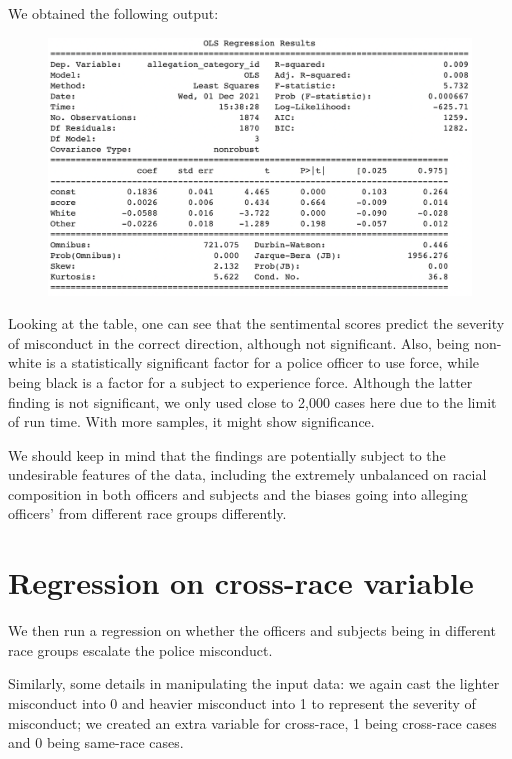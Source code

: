 \documentclass[10pt]{article}
\begin{document}
We obtained the following output:

\begin{figure}[H]
\centering
\includegraphics[width=\textwidth]{regression1}
\end{figure}


Looking at the table, one can see that the sentimental scores predict the severity of misconduct in the correct direction, although not significant. Also, being non-white is a statistically significant factor for a police officer to use force, while being black is a factor for a subject to experience force. Although the latter finding is not significant, we only used close to 2,000 cases here due to the limit of run time. With more samples, it might show significance. 

We should keep in mind that the findings are potentially subject to the undesirable features of the data, including the extremely unbalanced on racial composition in both officers and subjects and the biases going into alleging officers’ from different race groups differently.



\section{Regression on cross-race variable}

We then run a regression on whether the officers and subjects being in different race groups escalate the police misconduct.

Similarly, some details in manipulating the input data: we again cast the lighter misconduct into 0 and heavier misconduct into 1 to represent the severity of misconduct; we created an extra variable for cross-race, 1 being cross-race cases and 0 being same-race cases. 
\end{document}
